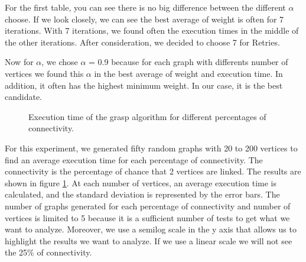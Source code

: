 For the first table, you can see there is no big difference between the different $\alpha$ choose.
If we look closely, we can see the best average of weight is often for 7 iterations.
With 7 iterations, we found often the execution times in the middle of the other iterations.
After consideration, we decided to choose 7 for Retries. 
\bigskip

Now for $\alpha$, we chose $\alpha$ = 0.9 because for each graph with differents number of vertices we found this $\alpha$ in the best average of weight and execution time.
In addition, it often has the highest  minimum weight. In our case, it is the best candidate.


\begin{figure}[H]
    \centering
    \caption{Execution time of the grasp algorithm for different percentages of connectivity.}
    \label{fig:grasp_time}
\end{figure}

For this experiment, we generated fifty random graphs with 20 to 200 vertices to
find an average execution time for each percentage of connectivity. The connectivity is the percentage of chance that 2 vertices are linked. The results
are shown in figure \ref{fig:grasp_time}. At each number of vertices, an average
execution time is calculated, and the standard deviation is represented by the
error bars. The number of graphs generated for each
percentage of connectivity and number of vertices is limited to 5 because it is a sufficient
number of tests to get what we want to analyze. Moreover, we use a semilog scale in the y axis that allows
us to highlight the results we want to analyze. If we use a linear scale we will not see the 25\% of connectivity.
